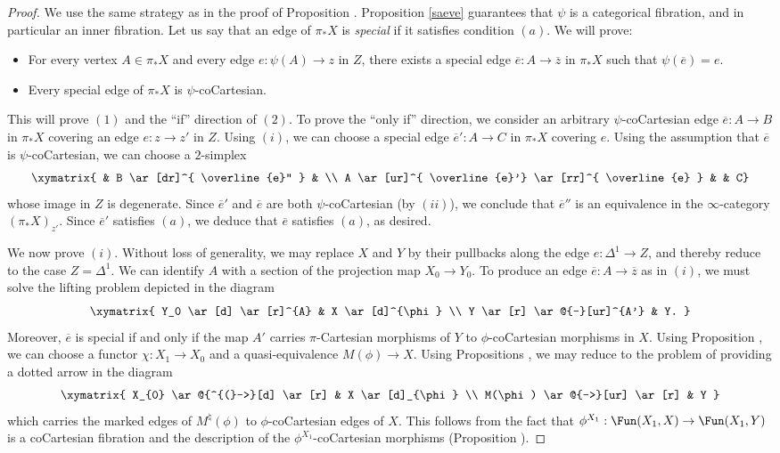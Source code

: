 \begin{proof}
We use the same strategy as in the proof of Proposition .
Proposition \ref{saeve} guarantees that $\psi$ is a categorical fibration, and in particular
an inner fibration. Let us say that an edge of $\pi_{\ast} X$ is {\it special} if it satisfies condition $(a)$. 
We will prove:
\begin{itemize}
\item[$(i)$] For every vertex $A \in \pi_{\ast} X$ and every edge $e: \psi(A) \rightarrow z$ in
$Z$, there exists a special edge $\overline{e}: A \rightarrow \overline{z}$ in $\pi_{\ast} X$
such that $\psi( \overline{e} ) = e$.
\item[$(ii)$] Every special edge of $\pi_{\ast} X$ is $\psi$-coCartesian.
\end{itemize}
This will prove $(1)$ and the ``if'' direction of $(2)$. To prove the ``only if'' direction, we consider
an arbitrary $\psi$-coCartesian edge $\overline{e}: A \rightarrow B$ in $\pi_{\ast} X$ covering an edge $e: z \rightarrow z'$ in $Z$. Using $(i)$, we can choose a special edge $\overline{e}': A \rightarrow C$ in $\pi_{\ast} X$ covering $e$. Using the assumption that $\overline{e}$ is $\psi$-coCartesian, we can choose
a $2$-simplex
$$ \xymatrix{ & B \ar[dr]^{ \overline{e}'' } & \\
A \ar[ur]^{ \overline{e}'} \ar[rr]^{ \overline{e} } & & C}$$
whose image in $Z$ is degenerate. Since $\overline{e}'$ and $\overline{e}$ are both
$\psi$-coCartesian (by $(ii)$), we conclude that $\overline{e}''$ is an equivalence in the $\infty$-category
$(\pi_{\ast} X)_{z'}$. Since $\overline{e}'$ satisfies $(a)$, we deduce that $\overline{e}$ satisfies
$(a)$, as desired.

We now prove $(i)$. Without loss of generality, we may replace $X$ and $Y$ by their pullbacks along the edge $e: \Delta^1 \rightarrow Z$, and thereby reduce to the case $Z = \Delta^1$. We can identify
$A$ with a section of the projection map $X_0 \rightarrow Y_0$. To produce an edge
$\overline{e}: A \rightarrow \overline{z}$ as in $(i)$, we must solve the lifting problem depicted in the diagram
$$ \xymatrix{ Y_0 \ar[d] \ar[r]^{A} & X \ar[d]^{\phi} \\
Y \ar[r] \ar@{--}[ur]^{A'} & Y. }$$
Moreover, $\overline{e}$ is special if and only if the map $A'$ carries $\pi$-Cartesian morphisms
of $Y$ to $\phi$-coCartesian morphisms in $X$. 
Using Proposition , we can choose a functor $\chi: X_1 \rightarrow X_0$
and a quasi-equivalence $M(\phi) \rightarrow X$.
Using Propositions , we may reduce to the problem of providing a dotted arrow in the diagram
$$ \xymatrix{ X_{0} \ar@{^{(}->}[d] \ar[r] & X \ar[d]_{\phi} \\
M(\phi) \ar@{-->}[ur] \ar[r] & Y }$$
which carries the marked edges of $M^{\natural}(\phi)$ to $\phi$-coCartesian edges of $X$.
This follows from the fact that $\phi^{X_1}: \Fun(X_1, X) \rightarrow \Fun(X_1, Y)$ is a coCartesian fibration and the description of the $\phi^{X_1}$-coCartesian morphisms (Proposition ).


\end{proof}
